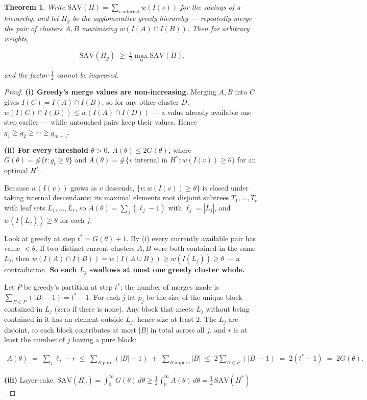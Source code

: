 \documentclass[11pt]{article}
\theoremstyle{plain}
\newtheorem{theorem}{Theorem}
\begin{document}
\begin{theorem}
Write $\mathrm{SAV}(H) = \sum_{v\ \mathrm{internal}} w(I(v))$ for the savings of a hierarchy, and let $H_g$ be the agglomerative greedy hierarchy --- repeatedly merge the pair of clusters $A,B$ maximising $w(I(A) \cap I(B))$. Then for arbitrary weights,

\begin{equation}
\mathrm{SAV}(H_g) \;\ge\; \tfrac12 \max_H \mathrm{SAV}(H),
\end{equation}

and the factor $\tfrac12$ cannot be improved.
\end{theorem}
\begin{proof}
\textbf{(i) Greedy's merge values are non-increasing.} Merging $A,B$ into $C$ gives $I(C) = I(A)\cap I(B)$, so for any other cluster $D$, $w(I(C)\cap I(D)) \le w(I(A)\cap I(D))$ --- a value already available one step earlier --- while untouched pairs keep their values. Hence $g_1 \ge g_2 \ge \cdots \ge g_{m-1}$.

\textbf{(ii) For every threshold $\theta>0$, $A(\theta) \le 2G(\theta)$,} where $G(\theta) = \#\{t : g_t \ge \theta\}$ and $A(\theta) = \#\{v \text{ internal in } H^* : w(I(v)) \ge \theta\}$ for an optimal $H^*$.

Because $w(I(v))$ grows as $v$ descends, $\{v : w(I(v)) \ge \theta\}$ is closed under taking internal descendants; its maximal elements root disjoint subtrees $T_1,\dots,T_r$ with leaf sets $L_1,\dots,L_r$, so $A(\theta) = \sum_j (\ell_j - 1)$ with $\ell_j = |L_j|$, and $w(I(L_j)) \ge \theta$ for each $j$.

Look at greedy at step $t^{*} = G(\theta)+1$. By (i) every currently available pair has value $< \theta$. If two distinct current clusters $A,B$ were both contained in the same $L_j$, then $w(I(A)\cap I(B)) = w(I(A\cup B)) \ge w(I(L_j)) \ge \theta$ --- a contradiction. \textbf{So each $L_j$ swallows at most one greedy cluster whole.}

Let $P$ be greedy's partition at step $t^{*}$; the number of merges made is $\sum_{B\in P}(|B|-1) = t^{*}-1$. For each $j$ let $p_j$ be the size of the unique block contained in $L_j$ (zero if there is none). Any block that meets $L_j$ without being contained in it has an element outside $L_j$, hence size at least 2. The $L_j$ are disjoint, so each block contributes at most $|B|$ in total across all $j$, and $r$ is at least the number of $j$ having a pure block:

\begin{equation}
\begin{split}
A(\theta) \;=\; \sum_j \ell_j - r \;\le\; \sum_{B\ \mathrm{pure}} (|B|-1) \;+\; \sum_{B\ \mathrm{impure}} |B|
\;\le\; 2\sum_{B \in P}(|B|-1) \;=\; 2(t^{*}-1) \;=\; 2G(\theta).
\end{split}
\end{equation}

\textbf{(iii)} Layer-cake: $\mathrm{SAV}(H_g) = \int_0^\infty G(\theta)\,d\theta \ge \tfrac12\int_0^\infty A(\theta)\,d\theta = \tfrac12\,\mathrm{SAV}(H^*)$. 
\end{proof}
\end{document}
